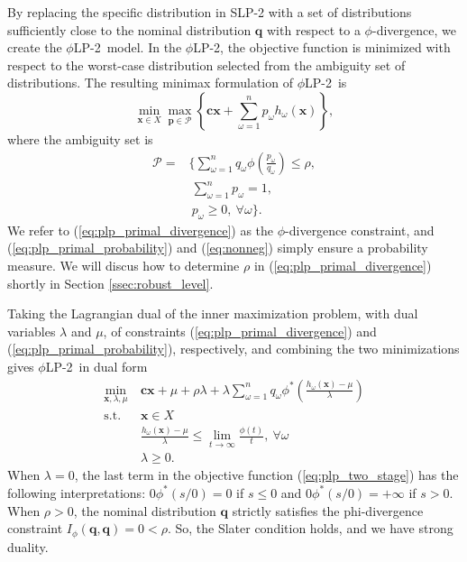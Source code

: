 \documentclass[opre,nonblindrev]{informs3} %
\newcommand{\x}{\mathbf{x}}
\renewcommand{\c}{\mathbf{c}}
\newcommand{\q}{\mathbf{q}}
\newcommand{\p}{\mathbf{p}}
\newcommand{\st}{\mbox{s.t.}}
\newcommand{\plp}{$\phi$LP-2}
\begin{document}
By replacing the specific distribution in SLP-2 with a set of distributions sufficiently close to the nominal distribution $\q$ with respect to a $\phi$-divergence, we create the \plp\ model.
In the \plp, the objective function is minimized with respect to the worst-case distribution selected from the ambiguity set of distributions.
The resulting minimax formulation of \plp\ is
\begin{equation}
	\min_{\x \in X} \max_{\p \in \mathcal{P}} \left\{ \c\x + \sum_{\omega=1}^{n} p_\omega h_\omega(\x) \right\}, \label{eq:plp_primal}
\end{equation}
where the ambiguity set is
\begin{align}
	\mathcal{P} = & \Bigg\{ \sum_{\omega = 1}^{n} q_\omega \phi\left(\frac{p_\omega}{q_\omega}\right) \leq \rho, \label{eq:plp_primal_divergence} \\
	& \ \sum_{\omega=1}^{n} p_\omega = 1, \label{eq:plp_primal_probability} \\
	& \  p_\omega \geq 0,\ \forall \omega \Bigg\}. \label{eq:nonneg}
\end{align}
We refer to (\ref{eq:plp_primal_divergence}) as the $\phi$-divergence constraint, and (\ref{eq:plp_primal_probability}) and (\ref{eq:nonneg}) simply ensure a probability measure.
We will discus how to determine $\rho$ in (\ref{eq:plp_primal_divergence}) shortly in Section \ref{ssec:robust_level}.

Taking the Lagrangian dual of the inner maximization problem, with dual variables $\lambda$ and $\mu$, of constraints (\ref{eq:plp_primal_divergence}) and (\ref{eq:plp_primal_probability}), respectively, and combining the two minimizations gives \plp\ in dual form
\begin{align}
	\min_{\x,\lambda,\mu} \ & \c\x + \mu + \rho \lambda + \lambda \sum_{\omega=1}^{n} q_\omega \phi^*\left(\frac{h_\omega(\x) - \mu}{\lambda}\right) \label{eq:plp_two_stage} \\
	\st \ & \x \in X \nonumber \\
	& \frac{h_\omega(\x) - \mu}{\lambda} \leq \lim_{t \rightarrow \infty} \frac{\phi(t)}{t}, \ \forall \omega \label{eq:plp_feas_constraint}\\
	& \lambda \geq 0. \nonumber
\end{align}
When $\lambda =0$, the last term in the objective function (\ref{eq:plp_two_stage}) has the following interpretations: $0\phi^*(s/0)=0$ if $s\leq 0$ and  $0\phi^*(s/0)=+\infty$ if $s > 0$.
When $\rho>0$, the nominal distribution $\q$ strictly satisfies the phi-divergence constraint $I_{\phi}(\q,\q)=0<\rho$. 
So, the Slater condition holds, and we have strong duality.
\end{document}
